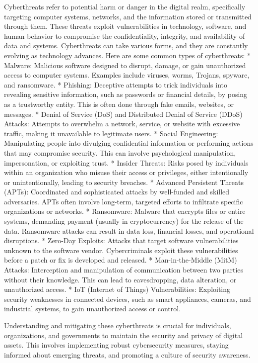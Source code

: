 \documentclass[
  letterpaper,
  DIV=11,
  numbers=noendperiod]{scrreprt}
\begin{document}
Cyberthreats refer to potential harm or danger in the digital realm,
specifically targeting computer systems, networks, and the information
stored or transmitted through them. These threats exploit
vulnerabilities in technology, software, and human behavior to
compromise the confidentiality, integrity, and availability of data and
systems. Cyberthreats can take various forms, and they are constantly
evolving as technology advances. Here are some common types of
cyberthreats: * Malware: Malicious software designed to disrupt, damage,
or gain unauthorized access to computer systems. Examples include
viruses, worms, Trojans, spyware, and ransomware. * Phishing: Deceptive
attempts to trick individuals into revealing sensitive information, such
as passwords or financial details, by posing as a trustworthy entity.
This is often done through fake emails, websites, or messages. * Denial
of Service (DoS) and Distributed Denial of Service (DDoS) Attacks:
Attempts to overwhelm a network, service, or website with excessive
traffic, making it unavailable to legitimate users. * Social
Engineering: Manipulating people into divulging confidential information
or performing actions that may compromise security. This can involve
psychological manipulation, impersonation, or exploiting trust. *
Insider Threats: Risks posed by individuals within an organization who
misuse their access or privileges, either intentionally or
unintentionally, leading to security breaches. * Advanced Persistent
Threats (APTs): Coordinated and sophisticated attacks by well-funded and
skilled adversaries. APTs often involve long-term, targeted efforts to
infiltrate specific organizations or networks. * Ransomware: Malware
that encrypts files or entire systems, demanding payment (usually in
cryptocurrency) for the release of the data. Ransomware attacks can
result in data loss, financial losses, and operational disruptions. *
Zero-Day Exploits: Attacks that target software vulnerabilities unknown
to the software vendor. Cybercriminals exploit these vulnerabilities
before a patch or fix is developed and released. * Man-in-the-Middle
(MitM) Attacks: Interception and manipulation of communication between
two parties without their knowledge. This can lead to eavesdropping,
data alteration, or unauthorized access. * IoT (Internet of Things)
Vulnerabilities: Exploiting security weaknesses in connected devices,
such as smart appliances, cameras, and industrial systems, to gain
unauthorized access or control.

Understanding and mitigating these cyberthreats is crucial for
individuals, organizations, and governments to maintain the security and
privacy of digital assets. This involves implementing robust
cybersecurity measures, staying informed about emerging threats, and
promoting a culture of security awareness.
\end{document}
